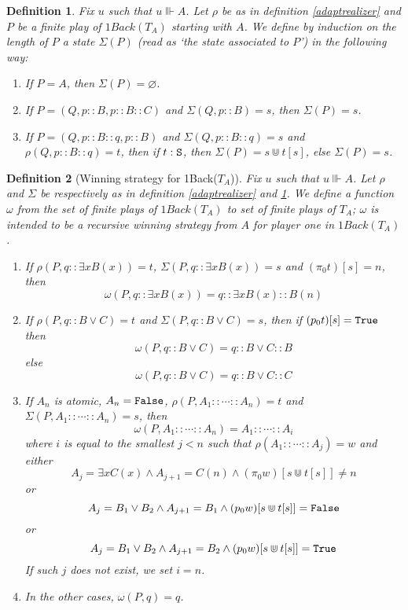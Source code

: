 \documentclass[copyright,creativecommons]{eptcs}
\newcommand{\State}                    { {\tt S} }
\newcommand{\True}                     { {\tt{True}} }
\newcommand{\False}                    { {\tt{False}} }
\newcommand{\proj}                     { {p} }
\newtheorem{definition}{Definition}
\begin{document}
\begin{definition}\label{adaptstate}
 Fix $u$ such that $u\Vvdash A$. Let $\rho$ be as in definition \ref{adaptrealizer} and $P$ be a finite play of $1Back(T_A)$ starting with $A$. We
define by induction on the length of $P$ a state $\Sigma(P)$ (read
as  `the state associated to $P$') in the following way:
\begin{enumerate} 
\item If $P=A$, then $\Sigma(P)=\varnothing$.
\item If $P=(Q, p::B, p::B::C)$ and $\Sigma(Q, p::B)=s$, then
$\Sigma(P)=s$.
 \item If $P=(Q, p::B::q, p::B)$ and $\Sigma(Q,
p::B::q)=s$ and $\rho(Q, p::B::q)=t$, then if $t:\State$, then
$\Sigma(P)=s\Cup t[s]$, else $\Sigma(P)=s$.\end{enumerate}

\end{definition}

\begin{definition}[Winning strategy for 1Back($T_A$)]\label{definition-winningstrategy}
Fix $u$ such that $u\Vvdash A$. Let $\rho$ and $\Sigma$ be respectively as in definition \ref{adaptrealizer} and \ref{adaptstate}. We define a function $\omega$ from the set of finite plays of
$1Back(T_A)$ to set of finite plays of $T_A$; $\omega$ is intended
to be a recursive winning strategy from $A$ for player one in $1Back(T_A)$.
 \begin{enumerate} 
 \item If $\rho(P,q::\exists x B(x))=t$,
$\Sigma(P,q::\exists x B(x))=s$ and $(\pi_0t)[s]={n}$,
then \[\omega(P,q::\exists x B(x))= q::\exists x B(x)::
B({n})\]

 \item If $\rho(P, q::B\lor C)=t$ and $\Sigma(P, q::B\lor C)=s$,
then if $(\proj_0t)[s]=\True$ then \[\omega(P, q::B\lor C)=q::B\lor
C::B\] else \[\omega(P, q::B\lor C)= q::B\lor C:: C\]

 \item If $A_n$ is atomic, $A_n=\False$, $\rho(P, A_1::\cdots::
A_n)=t$ and $\Sigma(P, A_1::\cdots ::A_n)=s$, then \[\omega(P,
A_1::\cdots:: A_n)= A_1::\cdots:: A_i\] where $i$ is equal to the smallest
$j< n$ such that $\rho( A_1::\cdots:: A_j)=w$ and either
\[A_j=\exists x C(x)\land  A_{j+1}= C({n}) \land
(\pi_0w)[s\Cup t[s]]\neq {n}\] 
or   \[A_j=B_1\lor B_2\land
A_{j+1}= B_1 \land (\proj_0w)[s\Cup t[s]]=\False\] 
or \[A_j=B_1\lor B_2\land A_{j+1}= B_2 \land
(\proj_0w)[s\Cup t[s]]=\True\] If such $j$ does not exist, we set $i=n$.
\item
In the other cases, $\omega(P,q)=q$.
\end{enumerate}

\end{definition}
\end{document}
